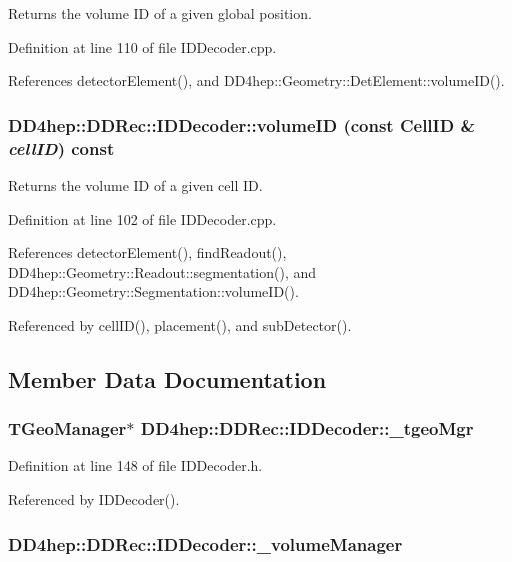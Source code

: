 Returns the volume ID of a given global position. 

Definition at line 110 of file IDDecoder.cpp.

References detectorElement(), and DD4hep::Geometry::DetElement::volumeID().\hypertarget{class_d_d4hep_1_1_d_d_rec_1_1_i_d_decoder_a0fa5014a696350c74feb78fff02c34c0}{
\subsubsection[{volumeID}]{ DD4hep::DDRec::IDDecoder::volumeID (const {\bf CellID} \& {\em cellID}) const}}
\label{class_d_d4hep_1_1_d_d_rec_1_1_i_d_decoder_a0fa5014a696350c74feb78fff02c34c0}


Returns the volume ID of a given cell ID. 

Definition at line 102 of file IDDecoder.cpp.

References detectorElement(), findReadout(), DD4hep::Geometry::Readout::segmentation(), and DD4hep::Geometry::Segmentation::volumeID().

Referenced by cellID(), placement(), and subDetector().

\subsection{Member Data Documentation}
\hypertarget{class_d_d4hep_1_1_d_d_rec_1_1_i_d_decoder_ac50ec26200a394bf0d75f44898910815}{
\subsubsection[{\_\-tgeoMgr}]{\setlength{\rightskip}{0pt plus 5cm}TGeoManager$\ast$ {\bf DD4hep::DDRec::IDDecoder::\_\-tgeoMgr}}}
\label{class_d_d4hep_1_1_d_d_rec_1_1_i_d_decoder_ac50ec26200a394bf0d75f44898910815}


Definition at line 148 of file IDDecoder.h.

Referenced by IDDecoder().\hypertarget{class_d_d4hep_1_1_d_d_rec_1_1_i_d_decoder_ad5da6c6624c9c8fa3fa9c0590d9bbb70}{
\subsubsection[{\_\-volumeManager}]{ {\bf DD4hep::DDRec::IDDecoder::\_\-volumeManager}}}
\label{class_d_d4hep_1_1_d_d_rec_1_1_i_d_decoder_ad5da6c6624c9c8fa3fa9c0590d9bbb70}


